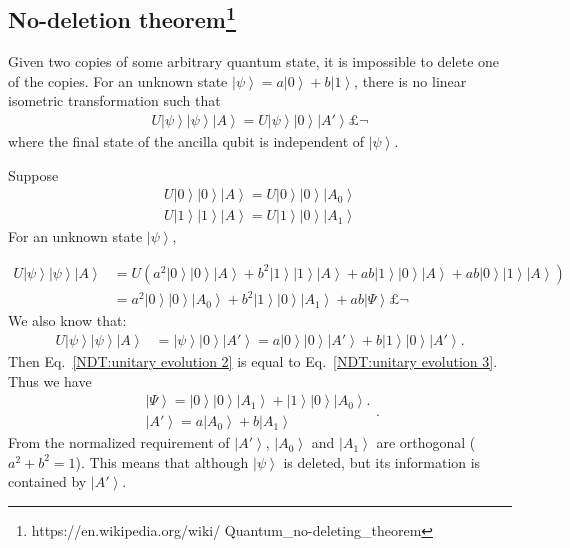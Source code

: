 \documentclass[onecolumn,pra,superscriptaddress,nofootinbib]{revtex4-1}
\newcommand{\ket}[1]{\mbox{$\left| #1 \right\rangle$}}
\begin{document}
\subsection{No-deletion theorem\footnote{https://en.wikipedia.org/wiki/
Quantum\_no-deleting\_theorem}}
Given two copies of some arbitrary
 quantum state, it is impossible to delete one of the copies. For an unknown state $\ket{\psi}=a\ket{0}+b\ket{1}$, there is no linear isometric transformation such that
\begin{equation} \label{NDT:unitary evolution}
\begin{aligned}
U\ket{\psi}\ket{\psi}\ket{A}=U\ket{\psi}\ket{0}\ket{A'}£¬
\end{aligned}
\end{equation}
where the final state of the ancilla qubit is independent of $\ket{\psi}$.

Suppose
\begin{equation} \label{NDT:unitary evolution 1}
\begin{aligned}
U\ket{0}\ket{0}\ket{A}=U\ket{0}\ket{0}\ket{A_0}\\
U\ket{1}\ket{1}\ket{A}=U\ket{1}\ket{0}\ket{A_1}
\end{aligned}
\end{equation}
For an unknown state $\ket{\psi}$,

\begin{equation} \label{NDT:unitary evolution 2}
\begin{aligned}
U\ket{\psi}\ket{\psi}\ket{A}&=
U(a^2\ket{0}\ket{0}\ket{A}+
b^2\ket{1}\ket{1}\ket{A}+ab\ket{1}\ket{0}\ket{A}+ab\ket{0}\ket{1}\ket{A})\\
&=a^2\ket{0}\ket{0}\ket{A_0}+b^2\ket{1}\ket{0}\ket{A_1}+ab\ket{\Psi}£¬
\end{aligned}
\end{equation}
We also know that:
\begin{equation} \label{NDT:unitary evolution 3}
\begin{aligned}
U\ket{\psi}\ket{\psi}\ket{A}&=\ket{\psi}\ket{0}
\ket{A'}=
a\ket{0}\ket{0}\ket{A'}+b\ket{1}\ket{0}\ket{A'}.
\end{aligned}
\end{equation}
Then Eq.~\eqref{NDT:unitary evolution 2} is equal to Eq.~\eqref{NDT:unitary evolution 3}. Thus we have 
\begin{equation}
\begin{aligned}
\ket{\Psi} = \ket{0}\ket{0}\ket{A_1}+\ket{1}\ket{0}
\ket{A_0}.\\
\ket{A'}=a\ket{A_0}+b\ket{A_1}
\end{aligned}. 
\end{equation}
From the normalized
requirement of $\ket{A'}$, $\ket{A_0}$ and $\ket{A_1}$ are orthogonal ($a^2+b^2=1$). This means that although $\ket{\psi}$ is deleted, but its information is contained by $\ket{A'}$. 
\end{document}
